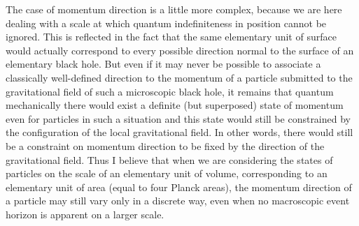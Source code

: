 \documentclass[notitlepage,12pt]{report}
\begin{document}
The case of momentum direction is a little more complex, because we are here dealing with a scale at which quantum indefiniteness in position cannot be ignored. This is reflected in the fact that the same elementary unit of surface would actually correspond to every possible direction normal to the surface of an elementary black hole. But even if it may never be possible to associate a classically well-defined direction to the momentum of a particle submitted to the gravitational field of such a microscopic black hole, it remains that quantum mechanically there would exist a definite (but superposed) state of momentum even for particles in such a situation and this state would still be constrained by the configuration of the local gravitational field. In other words, there would still be a constraint on momentum direction to be fixed by the direction of the gravitational field. Thus I believe that when we are considering the states of particles on the scale of an elementary unit of volume, corresponding to an elementary unit of area (equal to four Planck areas), the momentum direction of a particle may still vary only in a discrete way, even when no macroscopic event horizon is apparent on a larger scale.
\end{document}
